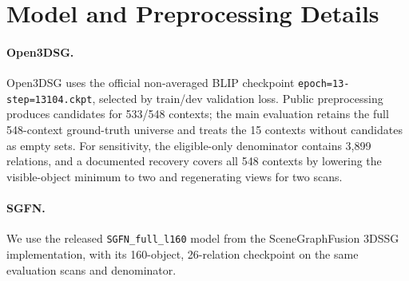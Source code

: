 \section{Model and Preprocessing Details}

\paragraph{Open3DSG.}
Open3DSG uses the official non-averaged BLIP checkpoint
\texttt{epoch=13-step=13104.ckpt}, selected by train/dev validation loss.
Public preprocessing produces candidates for 533/548 contexts; the main
evaluation retains the full 548-context ground-truth universe and treats the
15 contexts without candidates as empty sets. For sensitivity, the eligible-only denominator
contains 3,899 relations, and a documented recovery covers all 548 contexts by
lowering the visible-object minimum to two and regenerating views for two
scans.

\paragraph{SGFN.}
We use the released \texttt{SGFN\_full\_l160} model from the SceneGraphFusion
3DSSG implementation, with its 160-object, 26-relation checkpoint on the same
evaluation scans and denominator.
